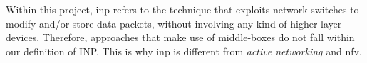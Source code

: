 Within this project, \gls{inp} refers to the technique that exploits network switches to modify and/or store data packets, without involving any kind of higher-layer devices.
Therefore, approaches that make use of middle-boxes do not fall within our definition of INP.
This is why \gls{inp} is different from \textit{active networking} and \gls{nfv}.